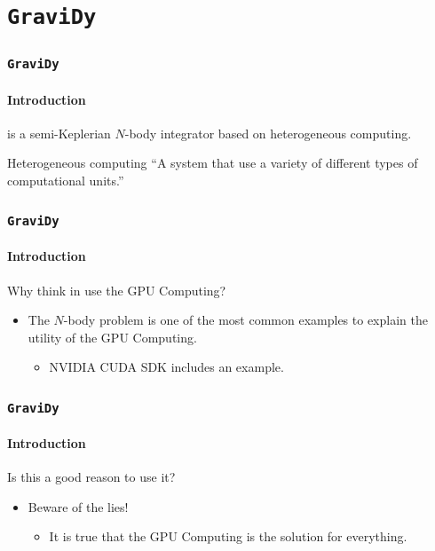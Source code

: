 \section{\texttt{GraviDy}}


\begin{frame}
    \frametitle{\texttt{GraviDy}}
    \framesubtitle{Introduction}
    \begin{center}
         is a semi-Keplerian $N$-body integrator based on heterogeneous computing.
    \end{center}
    \vspace{1cm}
    \small
    {
    \begin{block}{Heterogeneous computing}
            ``A system that use a variety of different types of computational units.''
    \end{block}
    }
\end{frame}

\begin{frame}
    \frametitle{\texttt{GraviDy}}
    \framesubtitle{Introduction}

    Why think in use the GPU Computing?

    \begin{itemize}
        \item<2-> The $N$-body problem is one of the most common examples
                  to explain the utility of the GPU Computing.
        \begin{itemize}
            \item<3-> NVIDIA CUDA SDK includes an example.
        \end{itemize}
    \end{itemize}
\end{frame}


\begin{frame}
    \frametitle{\texttt{GraviDy}}
    \framesubtitle{Introduction}

    Is this a good reason to use it?

    \begin{itemize}
        \item<2-> Beware of the lies!
        \begin{itemize}
            \item<2-> It is  true that the GPU Computing is the solution
                      for everything.
        \end{itemize}
    \end{itemize}
\end{frame}

